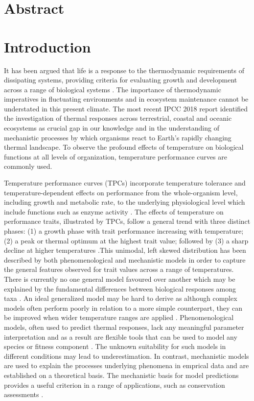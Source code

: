 \documentclass[12pt]{article}
\begin{document}
\tableofcontents
\newpage
\begin{linenumbers}
\section{Abstract}
\section{Introduction}
It has been argued that life is a response to the thermodynamic requirements of dissipating systems, providing criteria for evaluating growth and development across a range of biological systems \cite{Schneider2007OrderFD}. The importance of thermodynamic imperatives in fluctuating environments and in ecosystem maintenance cannot be understated in this present climate. The most recent IPCC 2018 report \cite{IPCC2018} identified the investigation of thermal responses across terrestrial, coastal and oceanic ecosystems as crucial gap in our knowledge and in the understanding of mechanistic processes by which organisms react to Earth's rapidly changing thermal landscape. To observe the profound effects of temperature on biological functions at all levels of organization, temperature performance curves are commonly used.

 
Temperature performance curves (TPCs) incorporate temperature tolerance and temperature-dependent effects on performance from the whole-organism level, including growth and metabolic rate, to the underlying physiological level which include functions such as enzyme activity \cite{10.1093/icb/icr097}\cite{doi:10.1890/12-2060.1}. The effects of temperature on performance traits, illustrated by TPCs, follow a general trend
with three distinct phases: (1) a growth phase with trait performance increasing with temperature; (2) a peak or thermal optimum at the highest trait value; followed by (3) a sharp decline at higher temperatures \cite{Schulte2015TheEO}.This unimodal, left skewed distribution has been described by both phenomenological and mechanistic models in order to capture the general features observed for trait values across a range of temperatures. There is currently no one general model favoured over another which may be explained by the fundamental differences between biological responses among taxa \cite{pub.1026914980}\cite{doi:10.1002/ece3.3576}. An ideal generalized model may be hard to derive as although complex models often perform poorly in relation to a more simple counterpart, they can be improved when wider temperature ranges are applied \cite{Quinn2017ACR}. Phenomenological models, often used to predict thermal responses, lack any meaningful parameter interpretation and as a result are flexible tools that can be used to model any species or fitness component \cite{Martin2017PhenomenologicalVB}. The unknown suitability for such models in different conditions may lead to underestimation. In contrast, mechanistic models are used to explain the processes underlying phenomena in emprical data and are established on a theoretical basis. The mechanistic basis for model predictions provides a useful criterion in a range of applications, such as conservation assessments \cite{doi:10.1098/rsbl.2005.0417}. 


\end{linenumbers}
\end{document}
